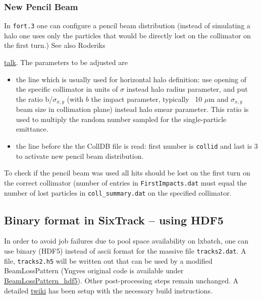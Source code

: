 \documentclass[a4paper, oneside, final]{scrartcl}
\begin{document}
{{\subsubsection{New Pencil Beam}
In \texttt{fort.3} one can configure a pencil beam distribution (instead of simulating a halo one uses only the particles that would be directly lost on the collimator on the first turn.) See also Roderiks {\href{https://indico.cern.ch/event/276974/}{talk}. The parameters to be adjusted are 

\begin{itemize}
\item the line which is usually used for horizontal halo definition: use opening of the specific collimator in units of $\sigma$ instead halo radius parameter, and put the ratio  b/$\sigma_{x,y}$ (with $b$ the impact parameter, typically ~10 $\mu$m and $\sigma_{x,y}$ beam size in collimation plane) instead halo smear parameter. This ratio is used to multiply the random number sampled for the single-particle emittance.

\item the line before the the CollDB file is read: first number is \texttt{collid} and last is $3$ to activate new pencil beam distribution. 

\end{itemize}

To check if the pencil beam was used all hits should be lost on the first turn on the correct collimator (number of entries in \texttt{FirstImpacts.dat} must equal the number of lost particles in \texttt{coll\_summary.dat} on the specified collimator.

\subsection{Binary format in SixTrack -- using HDF5\label{hdf5}}

In order to avoid job failures due to pool space availability on lxbatch, one can use binary (HDF5) instead of ascii format for the massive file \texttt{tracks2.dat}. A file, \texttt{tracks2.h5} will be written out that can be used by a modified BeamLossPattern (Yngves original code is available under {\href{https://github.com/rkwee/LHC-Collimation/tree/master/PostSixTrack/BeamLossPattern_hdf5}{BeamLossPattern\_hdf5}}). Other post-processing steps remain unchanged. A detailed {\href{https://twiki.cern.ch/twiki/bin/viewauth/LHCAtHome/SixTrackBuildHDF5}{twiki}} has been setup with the necessary build instructions. 

}}}
\end{document}
